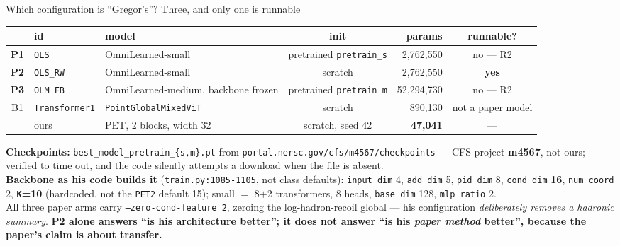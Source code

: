 \documentclass[aspectratio=169,10pt]{beamer}
\newcommand{\ours}[1]{\textcolor{ours}{#1}}
\newcommand{\warn}[1]{\textcolor{warn}{#1}}
\begin{document}
\begin{frame}[t]{Which configuration is ``Gregor's''? Three, and only one is runnable}
  \begin{center}\scriptsize
  \begin{tabular}{@{}clR{0.24\textwidth}crc@{}}
    \toprule
    & \textbf{id} & \textbf{model} & \textbf{init} & \textbf{params} & \textbf{runnable?} \\
    \midrule
    \textbf{P1} & \texttt{OLS} & OmniLearned-small & pretrained \texttt{pretrain\_s} &
      2{,}762{,}550 & \warn{no --- R2} \\
    \textbf{P2} & \texttt{OLS\_RW} & OmniLearned-small & scratch &
      2{,}762{,}550 & \ours{\textbf{yes}} \\
    \textbf{P3} & \texttt{OLM\_FB} & OmniLearned-medium, backbone frozen &
      pretrained \texttt{pretrain\_m} & 52{,}294{,}730 & \warn{no --- R2} \\
    \midrule
    B1 & \texttt{Transformer1} & \texttt{PointGlobalMixedViT} & scratch & 890{,}130 &
      \warn{not a paper model} \\
    \midrule
    & ours & PET, 2 blocks, width 32 & scratch, seed 42 & \textbf{47{,}041} & --- \\
    \bottomrule
  \end{tabular}
  \end{center}
  \vspace{0.3em}
  {\footnotesize
  \textbf{Checkpoints:} \texttt{best\_model\_pretrain\_\{s,m\}.pt} from
  \texttt{portal.nersc.gov/cfs/m4567/checkpoints} --- CFS project \textbf{m4567}, not
  ours; \warn{verified to time out}, and the code \warn{silently attempts a download when
  the file is absent}.
  \\[0.2em]
  \textbf{Backbone as his code builds it} (\texttt{train.py:1085-1105}, not class
  defaults): \texttt{input\_dim} 4, \texttt{add\_dim} 5, \texttt{pid\_dim} 8,
  \texttt{cond\_dim} \textbf{16}, \texttt{num\_coord} 2, \textbf{\texttt{K}=10}
  (hardcoded, not the \texttt{PET2} default 15); small $=$ 8$+$2 transformers, 8 heads,
  \texttt{base\_dim} 128, \texttt{mlp\_ratio} 2.
  \\[0.2em]
  \warn{All three paper arms carry \texttt{--zero-cond-feature 2}}, zeroing the
  log-hadron-recoil global --- his configuration \emph{deliberately removes a hadronic
  summary}. \textbf{P2 alone answers ``is his architecture better''; it does not answer
  ``is his \emph{paper method} better'', because the paper's claim is about transfer.}}
\end{frame}
\end{document}
